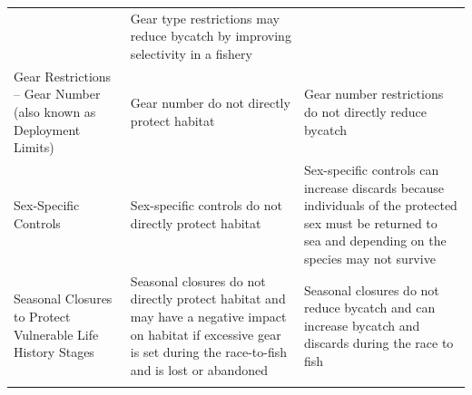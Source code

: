 \documentclass[]{book}
\begin{document}
\begin{longtable}[]{@{}lll@{}}
\begin{minipage}[t]{0.30\columnwidth}
\end{minipage} & \begin{minipage}[t]{0.30\columnwidth}\raggedright\strut
Gear type restrictions may reduce bycatch by improving selectivity in a
fishery\strut
\end{minipage}\tabularnewline
\begin{minipage}[t]{0.30\columnwidth}\raggedright\strut
Gear Restrictions -- Gear Number (also known as Deployment Limits)\strut
\end{minipage} & \begin{minipage}[t]{0.30\columnwidth}\raggedright\strut
Gear number do not directly protect habitat\strut
\end{minipage} & \begin{minipage}[t]{0.30\columnwidth}\raggedright\strut
Gear number restrictions do not directly reduce bycatch\strut
\end{minipage}\tabularnewline
\begin{minipage}[t]{0.30\columnwidth}\raggedright\strut
Sex-Specific Controls\strut
\end{minipage} & \begin{minipage}[t]{0.30\columnwidth}\raggedright\strut
Sex-specific controls do not directly protect habitat\strut
\end{minipage} & \begin{minipage}[t]{0.30\columnwidth}\raggedright\strut
Sex-specific controls can increase discards because individuals of the
protected sex must be returned to sea and depending on the species may
not survive\strut
\end{minipage}\tabularnewline
\begin{minipage}[t]{0.30\columnwidth}\raggedright\strut
Seasonal Closures to Protect Vulnerable Life History Stages\strut
\end{minipage} & \begin{minipage}[t]{0.30\columnwidth}\raggedright\strut
Seasonal closures do not directly protect habitat and may have a
negative impact on habitat if excessive gear is set during the
race-to-fish and is lost or abandoned\strut
\end{minipage} & \begin{minipage}[t]{0.30\columnwidth}\raggedright\strut
Seasonal closures do not reduce bycatch and can increase bycatch and
discards during the race to fish\strut
\end{minipage}\tabularnewline
\begin{minipage}[t]{0.30\columnwidth}\raggedright\strut

\end{minipage}
\end{longtable}
\end{document}
